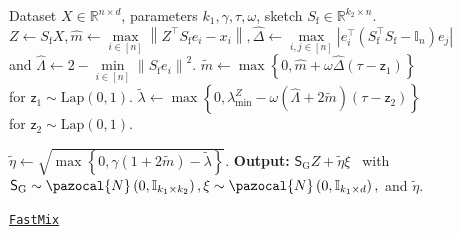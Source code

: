 \documentclass[11pt]{article}
\theoremstyle{definition}
\theoremstyle{plain}
\newcommand{\reals}{\mathbb{R}}
\providecommand{\brI}{\mathbb{I}}
\newcommand{\abs}[1]{\left| #1 \right|}
\newcommand{\Norm}[1]{\left\| #1 \right\|}
\providecommand{\norm}[1]{\Norm{#1}}
\newcommand{\pN}{\pazocal{N}}
\newcommand{\FastMix}{\hyperref[alg:fast_mixing]{\texttt{FastMix}}\xspace}
\begin{document}
\begin{figure}[t]
    \centering
    \begin{minipage}[t]{\textwidth}
        \begin{algorithm}[H]
        \caption{\FastMix} 
        \begin{algorithmic}[1]
            \Require Dataset $X\in\reals^{n\times d}$, parameters $k_1, \gamma, \tau, \omega$, sketch $S_{\mathrm{f}} \in \reals^{k_2\times n}$.
            \State $Z \leftarrow S_{\mathrm{f}}X, \widehat{m}\leftarrow \max\limits_{i \in [n]} \norm{Z^{\top}S_{\mathrm{f}}e_i - x_i}, \widehat{\Delta}\gets\max\limits_{i, j\in [n]} \abs{e^{\top}_i\left(S_{\mathrm{f}}^{\top}S_{\mathrm{f}}- \brI_n\right)e_j}$ and $\widehat{\Lambda} \gets 2 - \min\limits_{i \in [n]} \norm{S_{\mathrm{f}}e_i}^2$.  \label{line:aux_computes_FastMix} 
            \State $\widetilde{m} \gets \max\left\{0, \widehat{m} + \omega \widehat{\Delta} (\tau - \mathsf{z}_1)\right\}$ for $\mathsf{z}_1 \sim \mathrm{Lap}(0, 1)$.  \label{line:compute_m_tilde}
            \State $\widetilde{\lambda}\gets \max\left\{0, \lambda^{Z}_{\min} - \omega \left(\widehat{\Lambda} + 2\widetilde{m}\right) (\tau - \mathsf{z}_2)\right\}$ for $\mathsf{z}_2 \sim \mathrm{Lap}(0, 1)$. \label{line:compute_lambda_tilde}
             
            \State $\widetilde{\eta} \gets \sqrt{\max\left\{0, \gamma\left(1 + 2\widetilde{m}\right) - \widetilde{\lambda}\right\}}$. \label{line:compute_eta_tilde}
            \State \textbf{Output:} $\mathsf{S}_{\mathrm{G}}Z + \widetilde{\eta}\xi$ \ with $\mathsf{S}_{\mathrm{G}} \sim \pN\left(0, \brI_{k_1\times k_2}\right), \xi \sim \pN\left(0, \brI_{k_1\times d}\right),$ and $\widetilde{\eta}$.
        \end{algorithmic}
        \label{alg:fast_mixing}
        \end{algorithm}
    \end{minipage}
\end{figure}
\end{document}
